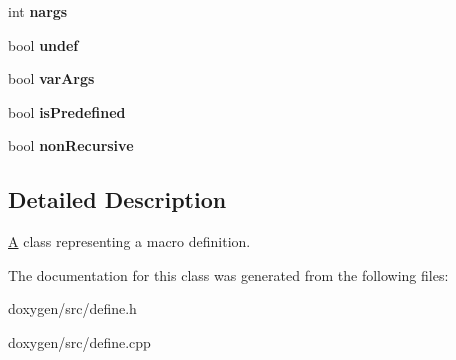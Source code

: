 \begin{DoxyCompactItemize}
\mbox{\label{class_define_ad3306a44c59125a65fbf9559abe97930}} 
int {\bfseries nargs}
\item 
\mbox{\label{class_define_afde97e0a7fadda62d088b18acc7a5a0e}} 
bool {\bfseries undef}
\item 
\mbox{\label{class_define_a1802523098fdd274fd15cd0494ad26d1}} 
bool {\bfseries var\+Args}
\item 
\mbox{\label{class_define_a856ae02f323f7e3f95fee4101da3904b}} 
bool {\bfseries is\+Predefined}
\item 
\mbox{\label{class_define_a673dcd69701965f0f62c73ce14dc6665}} 
bool {\bfseries non\+Recursive}
\end{DoxyCompactItemize}


\subsection{Detailed Description}
\mbox{\hyperlink{class_a}{A}} class representing a macro definition. 

The documentation for this class was generated from the following files\+:\begin{DoxyCompactItemize}
\item 
doxygen/src/define.\+h\item 
doxygen/src/define.\+cpp\end{DoxyCompactItemize}
